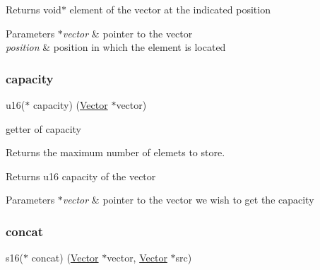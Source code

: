 \begin{DoxyReturn}{Returns}
void$\ast$ element of the vector at the indicated position 
\end{DoxyReturn}

\begin{DoxyParams}{Parameters}
{\em $\ast$vector} & pointer to the vector \\
\hline
{\em position} & position in which the element is located \\
\hline
\end{DoxyParams}
\mbox{\label{structadt__vector__ops__s_a41c9de03c40660dfbd699958ae366738}} 
\subsubsection{\texorpdfstring{capacity}{capacity}}
{\footnotesize\ttfamily u16($\ast$ capacity) (\hyperlink{structadt__vector__s}{Vector} $\ast$vector)}



getter of capacity 

Returns the maximum number of elemets to store.

\begin{DoxyReturn}{Returns}
u16 capacity of the vector 
\end{DoxyReturn}

\begin{DoxyParams}{Parameters}
{\em $\ast$vector} & pointer to the vector we wish to get the capacity \\
\hline
\end{DoxyParams}
\mbox{\label{structadt__vector__ops__s_a7d42a5ffca2fef23a61765a2878a478a}} 
\subsubsection{\texorpdfstring{concat}{concat}}
{\footnotesize\ttfamily s16($\ast$ concat) (\hyperlink{structadt__vector__s}{Vector} $\ast$vector, \hyperlink{structadt__vector__s}{Vector} $\ast$src)}



